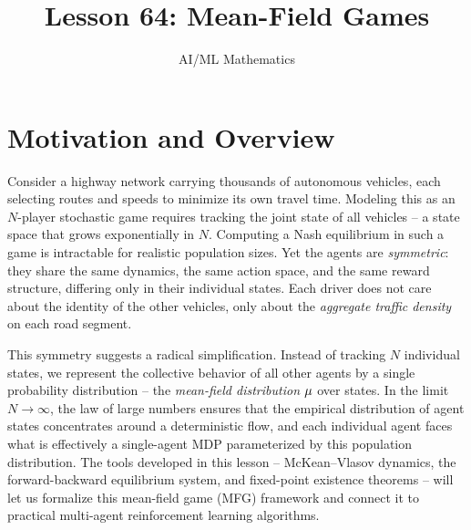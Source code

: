 \documentclass[11pt,a4paper]{article}
\title{Lesson 64: Mean-Field Games}
\author{AI/ML Mathematics}
\date{}
\begin{document}
\maketitle
\tableofcontents
\newpage

\section{Motivation and Overview}
\label{sec:motivation}

Consider a highway network carrying thousands of autonomous vehicles,
each selecting routes and speeds to minimize its own travel time.
Modeling this as an $N$-player stochastic game requires tracking the
joint state of all vehicles -- a state space that grows exponentially
in $N$.  Computing a Nash equilibrium in such a game is intractable
for realistic population sizes.  Yet the agents are \emph{symmetric}:
they share the same dynamics, the same action space, and the same
reward structure, differing only in their individual states.  Each
driver does not care about the identity of the other vehicles, only
about the \emph{aggregate traffic density} on each road segment.

This symmetry suggests a radical simplification.  Instead of tracking
$N$ individual states, we represent the collective behavior of all
other agents by a single probability distribution -- the
\emph{mean-field distribution} $\mu$ over states.  In the
limit $N \to \infty$, the law of large numbers ensures that the
empirical distribution of agent states concentrates around a
deterministic flow, and each individual agent faces what is
effectively a single-agent MDP parameterized by this population
distribution.  The tools developed in this lesson -- McKean--Vlasov
dynamics, the forward-backward equilibrium system, and fixed-point
existence theorems -- will let us formalize this mean-field game
(MFG) framework and connect it to practical multi-agent reinforcement
learning algorithms.
\end{document}
